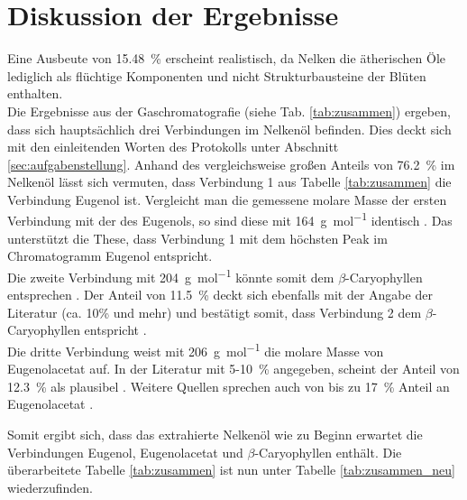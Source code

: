 \newpage
\section{Diskussion der Ergebnisse}
\label{sec:diskussion}

Eine Ausbeute von \SI{15,48}{\percent} erscheint realistisch, da Nelken die ätherischen Öle lediglich als flüchtige Komponenten und nicht Strukturbausteine der Blüten enthalten.\\

Die Ergebnisse aus der Gaschromatografie (siehe Tab. \ref{tab:zusammen}) ergeben, dass sich hauptsächlich drei Verbindungen im Nelkenöl befinden. Dies deckt sich mit den einleitenden Worten des Protokolls unter Abschnitt \ref{sec:aufgabenstellung}. 
Anhand des vergleichsweise großen Anteils von \SI{76,2}{\percent} im Nelkenöl lässt sich vermuten, dass Verbindung 1 aus Tabelle \ref{tab:zusammen} die Verbindung Eugenol ist. Vergleicht man die gemessene molare Masse der ersten Verbindung mit der des Eugenols, so sind diese mit \SI{164}{\gram \per \mole} identisch \cite{Berger.2017}. Das unterstützt die These, dass Verbindung 1 mit dem höchsten Peak im Chromatogramm Eugenol entspricht.\\
Die zweite Verbindung mit \SI{204}{\gram \per \mole} könnte somit dem $\beta$-Caryophyllen entsprechen \cite{ROMPPRedaktion.2002}. Der Anteil von \SI{11,5}{\percent} deckt sich ebenfalls mit der Angabe der Literatur (ca. 10\% und mehr) und bestätigt somit, dass Verbindung 2 dem $\beta$-Caryophyllen entspricht \cite{Krammer.2003}.\\
Die dritte Verbindung weist mit \SI{206}{\gram \per \mol} die molare Masse von Eugenolacetat auf. In der Literatur mit 5-\SI{10}{\percent} angegeben, scheint der Anteil von \SI{12,3}{\percent} als plausibel \cite{Krammer.2003}. Weitere Quellen sprechen auch von bis zu \SI{17}{\percent} Anteil an Eugenolacetat \cite{Wikipedia.2020}.

Somit ergibt sich, dass das extrahierte Nelkenöl wie zu Beginn erwartet die Verbindungen Eugenol, Eugenolacetat und $\beta$-Caryophyllen enthält. Die überarbeitete Tabelle \ref{tab:zusammen} ist nun unter Tabelle \ref{tab:zusammen_neu} wiederzufinden.

\begin{table}[h!]
	\renewcommand*{\arraystretch}{1.2}
	\centering
	\caption{Gaschromatische und massenspektroskopische Daten des Nelkenöls}
	\label{tab:zusammen_neu}
\end{table}%
\FloatBarrier
